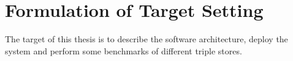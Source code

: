 \chapter{Formulation of Target Setting}
\label{ch:target_setting}

The target of this thesis is to describe the software architecture, deploy the system and perform some benchmarks of different triple stores.






%
%
%
